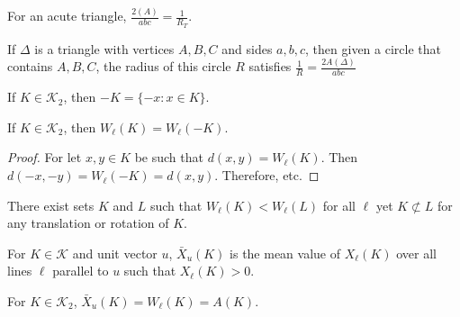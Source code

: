         \begin{theorem}
        For an acute triangle, $\frac{2(A)}{abc} = \frac{1}{R_T}$.
        \end{theorem}
        \begin{theorem}
        If $\Delta$ is a triangle with vertices $A,B,C$ and sides $a,b,c$, then given a circle that contains $A,B,C$, the radius of this circle $R$ satisfies $\frac{1}{R} =\frac{2A(\Delta)}{abc}$
        \end{theorem}
        \begin{definition}
        If $K\in \mathscr{K}_2$, then $-K = \{-x:x\in K\}$.
        \end{definition}
        \begin{theorem}
        If $K\in \mathscr{K}_2$, then $W_{\ell}(K) = W_{\ell}(-K)$.
        \end{theorem}
        \begin{proof}
        For let $x,y\in K$ be such that $d(x,y) = W_{\ell}(K)$. Then $d(-x,-y) = W_{\ell}(-K) = d(x,y)$. Therefore, etc.
        \end{proof}
        \begin{theorem}
        There exist sets $K$ and $L$ such that $W_{\ell}(K)<W_{\ell}(L)$ for all $\ell$ yet $K\not\subset L$ for any translation or rotation of $K$.
        \end{theorem}
        \begin{definition}
        For $K\in \mathscr{K}$ and unit vector $u$, $\bar{X}_{u}(K)$ is the mean value of $X_{\ell}(K)$ over all lines $\ell$ parallel to $u$ such that $X_{\ell}(K)>0$.
        \end{definition}
        \begin{theorem}
        For $K\in \mathscr{K}_2$, $\bar{X}_{u}(K) = W_{\ell}(K)=A(K)$.
        \end{theorem}
